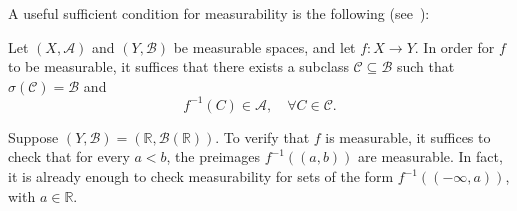 A useful sufficient condition for measurability is the following (see~\cite[Prop.~1.9]{MeasureTheoryLeGall}):

\begin{proposition}
    \label{prop:measurability-sufficient-cond}
    Let $(X, \mathcal{A})$ and $(Y, \mathcal{B})$ be measurable spaces, and let $f : X \to Y$. In order for $f$ to be measurable, it suffices that there exists a subclass $\mathcal{C} \subseteq \mathcal{B}$ such that $\sigma(\mathcal{C}) = \mathcal{B}$ and
    \[
        f^{-1}(C) \in \mathcal{A}, \quad \forall C \in \mathcal{C}.
    \]
\end{proposition}

\begin{example}
    Suppose $(Y, \mathcal{B}) = (\mathbb{R}, \mathcal{B}(\mathbb{R}))$. To verify that $f$ is measurable, it suffices to check that for every $a < b$, the preimages $f^{-1}((a,b))$ are measurable. In fact, it is already enough to check measurability for sets of the form $f^{-1}((-\infty,a))$, with $a \in \mathbb{R}$.
\end{example}


%
%
%
%


